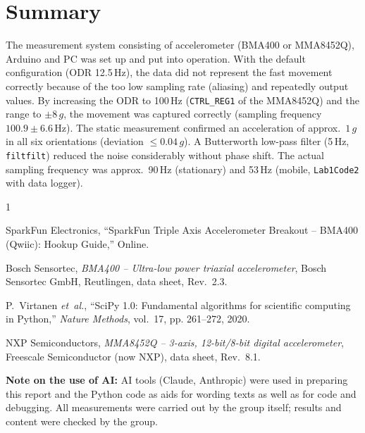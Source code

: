 \documentclass[a4paper,oneside,10pt]{article}
\begin{document}
\section{Summary}
The measurement system consisting of accelerometer (BMA400 or MMA8452Q), Arduino and PC
was set up and put into operation. With the default configuration (ODR
12.5\,Hz), the data did not represent the fast movement correctly because of the too low sampling rate
(aliasing) and repeatedly output values. By increasing the ODR
to 100\,Hz (\texttt{CTRL\_REG1} of the MMA8452Q) and the range to $\pm 8\,g$,
the movement was captured correctly (sampling frequency $100.9 \pm 6.6$\,Hz). The static measurement
confirmed an acceleration of approx.\ $1\,g$ in all six orientations (deviation
$\leq 0.04\,g$). A Butterworth low-pass filter (5\,Hz, \texttt{filtfilt}) reduced the
noise considerably without phase shift. The actual sampling frequency was
approx.\ 90\,Hz (stationary) and 53\,Hz (mobile, \texttt{Lab1Code2} with data logger).

\begin{thebibliography}{1}
\providecommand{\url}[1]{#1}
\providecommand{\newblock}{\relax}

{SparkFun Electronics}, ``{SparkFun Triple Axis Accelerometer Breakout --
  BMA400 (Qwiic): Hookup Guide},'' Online.

{Bosch Sensortec}, \emph{{BMA400 -- Ultra-low power triaxial accelerometer}},
  Bosch Sensortec GmbH, Reutlingen, data sheet, Rev.~2.3.

P.~Virtanen \emph{et~al.}, ``{SciPy 1.0: Fundamental algorithms for scientific
  computing in Python},'' \emph{Nature Methods}, vol.~17, pp. 261--272, 2020.

{NXP Semiconductors}, \emph{{MMA8452Q -- 3-axis, 12-bit/8-bit digital
  accelerometer}}, Freescale Semiconductor (now NXP), data sheet, Rev.~8.1.

\end{thebibliography}

\textbf{Note on the use of AI:} AI tools (Claude, Anthropic) were used in preparing this report and the
Python code as aids for wording texts as well as for code and debugging. All measurements
were carried out by the group itself; results and content were checked by the group.
\end{document}
